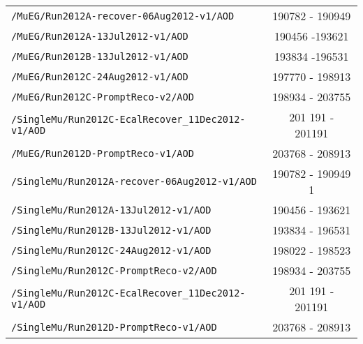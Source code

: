 \begin{table}[hbt]
\begin{center}
\begin{tabular}{lc}
\verb=/MuEG/Run2012A-recover-06Aug2012-v1/AOD=                          &      190782 - 190949                 \\ 
\verb=/MuEG/Run2012A-13Jul2012-v1/AOD=                                          &  190456 -193621                     \\ 
\verb=/MuEG/Run2012B-13Jul2012-v1/AOD=                                         &  193834 -196531       \\ 
\verb=/MuEG/Run2012C-24Aug2012-v1/AOD=                                      &   197770 - 198913                 \\ 
\verb=/MuEG/Run2012C-PromptReco-v2/AOD=                                     &   198934 - 203755                    \\ 
\verb=/SingleMu/Run2012C-EcalRecover_11Dec2012-v1/AOD=          & 201 191 - 201191 \\
\verb=/MuEG/Run2012D-PromptReco-v1/AOD=                                     &  203768 - 208913   \\

\verb=/SingleMu/Run2012A-recover-06Aug2012-v1/AOD=                    &   190782 - 190949          1          \\ 
\verb=/SingleMu/Run2012A-13Jul2012-v1/AOD=                                     &  190456 - 193621                      \\ 
\verb=/SingleMu/Run2012B-13Jul2012-v1/AOD=                                     &  193834 - 196531   \\ 
\verb=/SingleMu/Run2012C-24Aug2012-v1/AOD=                                   &   198022 - 198523                    \\ 
\verb=/SingleMu/Run2012C-PromptReco-v2/AOD=                                  &   198934 - 203755                    \\ 
\verb=/SingleMu/Run2012C-EcalRecover_11Dec2012-v1/AOD=          & 201 191 - 201191  \\
\verb=/SingleMu/Run2012D-PromptReco-v1/AOD=                                  &  203768 - 208913    \\

 \hline\hline
\end{tabular}
\end{center}
\end{table}



